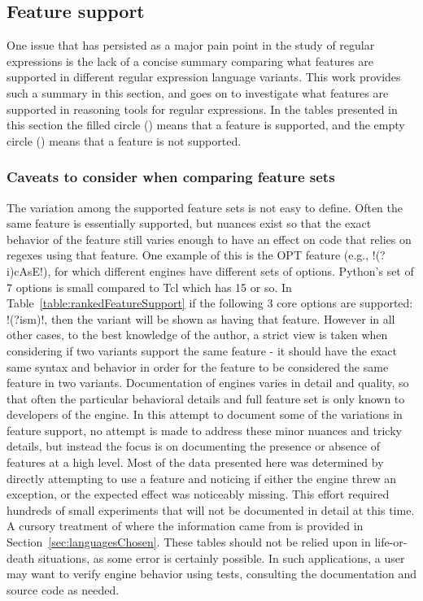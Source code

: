 \subsection{Feature support}

One issue that has persisted as a major pain point in the study of regular expressions is the lack of a concise summary comparing what features are supported in different regular expression language variants.  This work provides such a summary in this section, and goes on to investigate what features are supported in reasoning tools for regular expressions.  In the tables presented in this section the filled circle (\yes) means that a feature is supported, and the empty circle (\no) means that a feature is not supported.

\subsubsection{Caveats to consider when comparing feature sets}
The variation among the supported feature sets is not easy to define.  Often the same feature is essentially supported, but nuances exist so that the exact behavior of the feature still varies enough to have an effect on code that relies on regexes using that feature.  One example of this is the OPT feature (e.g., \cverb!(?i)cAsE!), for which different engines have different sets of options.  Python's set of 7 options is small compared to Tcl which has 15 or so.  In Table~\ref{table:rankedFeatureSupport} if the following 3 core options are supported: \cverb!(?ism)!, then the variant will be shown as having that feature.  However in all other cases, to the best knowledge of the author, a strict view is taken when considering if two variants support the same feature - it should have the exact same syntax and behavior in order for the feature to be considered the same feature in two variants.  Documentation of engines varies in detail and quality, so that often the particular behavioral details and full feature set is only known to developers of the engine.  In this attempt to document some of the variations in feature support, no attempt is made to address these minor nuances and tricky details, but instead the focus is on documenting the presence or absence of features at a high level.  Most of the data presented here was determined by directly attempting to use a feature and noticing if either the engine threw an exception, or the expected effect was noticeably missing.  This effort required hundreds of small experiments that will not be documented in detail at this time.  A cursory treatment of where the information came from is provided in Section~\ref{sec:languagesChosen}.  These tables should not be relied upon in life-or-death situations, as some error is certainly possible.  In such applications, a user may want to verify engine behavior using tests, consulting the documentation and source code as needed.

